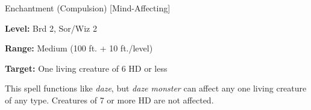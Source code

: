 
Enchantment (Compulsion) [Mind-Affecting]

\textbf{Level:} Brd 2, Sor/Wiz 2

\textbf{Range:} Medium (100 ft. + 10 ft./level)

\textbf{Target:} One living creature of 6 HD or less

This spell functions like \textit{daze}, but \textit{daze monster} can affect any 
one living creature of any type. Creatures of 7 or more HD are not affected.

